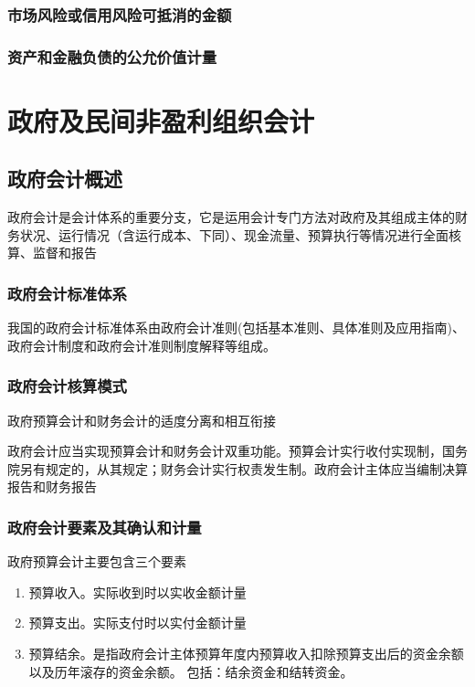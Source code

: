 \documentclass[UTF8,12pt]{ctexart}
\numberwithin{equation}{section} %
\numberwithin{figure}{section}
\numberwithin{table}{section}
\begin{document}
	\subsubsection{市场风险或信用风险可抵消的金额}
	\subsubsection{资产和金融负债的公允价值计量}
	
	\newpage
	
	\section{政府及民间非盈利组织会计}
	\subsection{政府会计概述}
	政府会计是会计体系的重要分支，它是运用会计专门方法对政府及其组成主体的财务状况、运行情况（含运行成本、下同）、现金流量、预算执行等情况进行全面核算、监督和报告
	\subsubsection{政府会计标准体系}
	我国的政府会计标准体系由政府会计准则(包括基本准则、具体准则及应用指南)、政府会计制度和政府会计准则制度解释等组成。
	\subsubsection{政府会计核算模式}
	政府预算会计和财务会计的适度分离和相互衔接
	
	政府会计应当实现预算会计和财务会计双重功能。预算会计实行收付实现制，国务院另有规定的，从其规定；财务会计实行权责发生制。政府会计主体应当编制决算报告和财务报告
	\subsubsection{政府会计要素及其确认和计量}
	政府预算会计主要包含三个要素
	\begin{enumerate}
		\item 预算收入。实际收到时以实收金额计量
		
		\item 预算支出。实际支付时以实付金额计量
		
		\item 预算结余。是指政府会计主体预算年度内预算收入扣除预算支出后的资金余额以及历年滚存的资金余额。
		包括：结余资金和结转资金。
	\end{enumerate}
	
\end{document}
